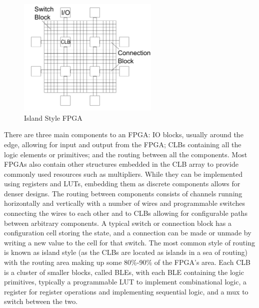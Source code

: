 \documentclass[12pt,final,oneside,a4paper]{dwThesis} %
\begin{document}
   \begin{figure}

      \begin{center}

         \includegraphics[width=0.6\textwidth]{images/ArchFull.pdf}
         \caption{Island Style FPGA} \label{FPGAArch} 
      \end{center}

   \end{figure}


   There are three main components to an \gls{FPGA}: \gls{IO} blocks, usually
   around the edge, allowing for input and output from the \gls{FPGA};
   \glspl{CLB} containing all the logic elements or \glspl{primitive}; and the
   routing between all the components.  Most \glspl{FPGA} also contain other
   structures embedded in the \gls{CLB} array to provide commonly used
   resources such as multipliers. While they can be implemented using registers
   and \glspl{LUT}, embedding them as discrete components allows for denser
   designs.  The routing between components consists of channels running
   horizontally and vertically with a number of wires and programmable switches
   connecting the wires to each other and to \glspl{CLB} allowing for
   configurable paths between arbitrary components. A typical switch or
   connection block has a configuration cell storing the state, and a
   connection can be made or unmade by writing a new value to the cell for that
   switch. The most common style of routing is known as island style (as the
   \glspl{CLB} are located as islands in a sea of routing) with the routing
   area making up some 80\%-90\% of the \gls{FPGA}'s area\cite{FPGAArch}.  Each
   \gls{CLB} is a cluster of smaller blocks, called \glspl{BLE}, with each
   \gls{BLE} containing the logic primitives, typically a programmable
   \gls{LUT} to implement combinational logic, a register for register operations
   and implementing sequential logic, and a \gls{mux} to switch between the
   two.
   
\end{document}

